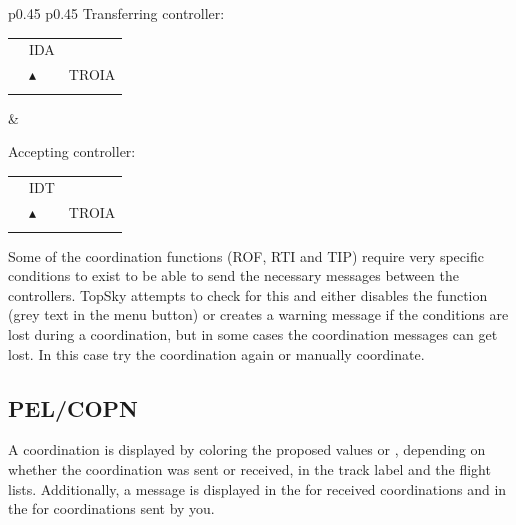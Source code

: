 \documentclass[a4paper,oneside,11pt]{memoir}
\begin{document}
\bigskip

\begin{longtable}{p{} p{}}
  Transferring controller:

  \begin{tabular}{
    >{\columncolor{Flight Highlight}}l 
    >{\columncolor{Flight Highlight}}l
    >{\columncolor{Flight Highlight}}l }
    {\color{Assumed} ABC123} & {\color{Coordination} IDA}       & {\color{Assumed} }      \\
    {\color{Assumed} 100}    & {\color{Assumed} $\blacktriangle$} & {\color{Assumed} TROIA} \\
    {\color{Assumed} 180}    & {\color{Assumed} }          & {\color{Assumed} }     
  \end{tabular}
  &

  Accepting controller:

  \begin{tabular}{
    >{\columncolor{Flight Highlight}}l 
    >{\columncolor{Flight Highlight}}l
    >{\columncolor{Flight Highlight}}l }
    {\color{Coordination} ABC123} & {\color{Coordination} IDT}       & {\color{Coordination} }      \\
    {\color{Coordination} 100}    & {\color{Coordination} $\blacktriangle$} & {\color{Coordination} TROIA} \\
    {\color{Coordination} 180}    & {\color{Coordination} }          & {\color{Coordination} }     
  \end{tabular}
  \end{longtable}

\bigskip

Some of the coordination functions (ROF, RTI and TIP) require very specific conditions to exist to be able to send the necessary messages between the controllers. TopSky attempts to check for this and either disables the function (grey text in the menu button) or creates a warning message if the conditions are lost during a coordination, but in some cases the coordination messages can get lost. In this case try the coordination again or manually coordinate.

\subsection{PEL/COPN}

A coordination is displayed by coloring the proposed values  or , depending on whether the coordination was sent or received, in the track label and the flight lists. Additionally, a message is displayed in the  for received coordinations and in the  for coordinations sent by you.
\end{document}
